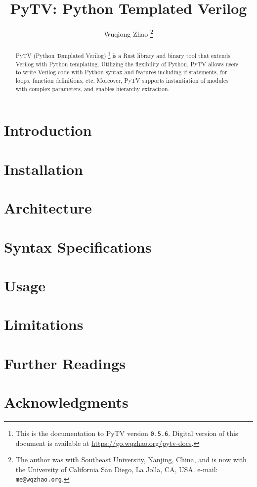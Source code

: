 \documentclass{article}
\title{PyTV: Python Templated Verilog}
\author{Wuqiong Zhao%
  \thanks{The author was with Southeast University, Nanjing, China,
  and is now with the University of California San Diego, La Jolla, CA, USA.
  e-mail: \texttt{me@wqzhao.org}.}}
\newcommand{\pytvversion}{0.5.6}
\begin{document}
\maketitle

\begin{abstract}
  PyTV (Python Templated Verilog)%
  \footnote{This is the documentation to PyTV version \texttt{\pytvversion{}}.
  Digital version of this document is available at \url{https://go.wqzhao.org/pytv-docs}.}
  is a Rust library and binary tool that extends Verilog with Python templating.
  Utilizing the flexibility of Python,
  PyTV allows users to write Verilog code with Python syntax and features
  including if statements, for loops, function definitions, etc.
  Moreover, PyTV supports instantiation of modules with complex parameters,
  and enables hierarchy extraction.
\end{abstract}

\tableofcontents

\section{Introduction}\label{sec:introduction}


\section{Installation}\label{sec:installation}


\section{Architecture}\label{sec:architecture}


\section{Syntax Specifications}\label{sec:syntax}


\section{Usage}\label{sec:usage}


\section{Limitations}\label{sec:limitations}


\section{Further Readings}\label{sec:ads}


\section*{Acknowledgments}



{}
\bgroup
\small

\egroup
\end{document}
